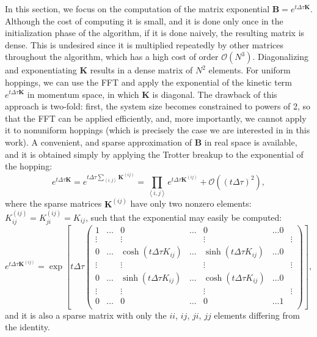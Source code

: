 In this section, we focus on the computation of the matrix exponential $\bm B = e^{t \Delta \tau \bm K}$.
Although the cost of computing it is small, and it is done only once in the initialization phase of the algorithm, if it is done naively, the resulting matrix is dense.
This is undesired since it is multiplied repeatedly by other matrices throughout the algorithm, which has a high cost of order $\mathcal{O}(N^3)$.
Diagonalizing and exponentiating $\bm K$ results in a dense matrix of $N^2$ elements.
For uniform hoppings, we can use the \ac{FFT} and apply the exponential of the kinetic term $e^{t \Delta \tau \bm K }$ in momentum space, in which $\bm K$ is diagonal.
The drawback of this approach is two-fold: first, the system size becomes constrained to powers of 2, so that the \ac{FFT} can be applied efficiently, and, more importantly, we cannot apply it to nonuniform hoppings (which is precisely the case we are interested in in this work).
A convenient, and sparse approximation of $\bm B$ in real space is available, and it is obtained simply by applying the Trotter breakup to the exponential of the hopping:
\begin{equation}
e^{t \Delta \tau \bm K } = e^{t \Delta \tau \sum_{\left\langle i, j \right\rangle} \bm K^{(ij)} } = \prod_{\left\langle i, j \right\rangle} e^{t \Delta \tau\bm K^{(ij)}} + \mathcal{O} ( (t \Delta \tau)^2 ) ,
\end{equation}
where the sparse matrices $\bm K^{(ij)}$ have only two nonzero elements: $K_{ij}^{(ij)} = K_{ji}^{(ij)} = K_{ij}$, such that the exponential may easily be computed:
\begin{equation}
e^{t\Delta\tau \bm K^{(ij)} } = \exp \left[ t\Delta\tau
\begin{pmatrix}
1 & \dots & 0 & \dots & 0 & \dots 0 \\
\vdots & & \vdots & & \vdots & & \vdots \\
0 & \dots & \cosh (  t\Delta\tau K_{ij} ) & \dots & \sinh (  t\Delta\tau K_{ij} ) & \dots 0 \\
\vdots & & \vdots & & \vdots & & \vdots \\
0 & \dots & \sinh (  t\Delta\tau K_{ij} ) & \dots & \cosh (  t\Delta\tau K_{ij} ) & \dots 0 \\
\vdots & & \vdots & & \vdots & & \vdots \\
0 & \dots & 0 & \dots & 0 & \dots 1 \\
\end{pmatrix}
\right] ,
\end{equation}
and it is also a sparse matrix with only the $ii$, $ij$, $ji$, $jj$ elements differing from the identity.
